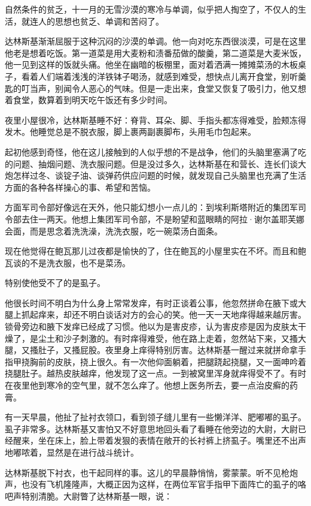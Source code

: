 自然条件的贫乏，十一月的无雪沙漠的寒冷与单调，似乎把人掏空了，不仅人的生活，就连人的思想也贫乏、单调和苦闷了。

达林斯基渐渐屈服于这种沉闷的沙漠的单调。他一向对吃东西很淡漠，可是在这里他老是想着吃饭。第一道菜是用大麦粉和渍番茄做的酸羹，第二道菜是大麦米饭，他一见到这样的饭就头痛。他坐在幽暗的板棚里，面对着洒满一摊摊菜汤的木板桌子，看着人们端着浅浅的洋铁钵子喝汤，就感到难受，想快点儿离开食堂，别听羹匙的叮当声，别闻令人恶心的气味。但是一走出来，食堂又恢复了吸引力，他又想着食堂，数算着到明天吃午饭还有多少时间。

夜里小屋很冷，达林斯基睡不好：脊背、耳朵、脚、手指头都冻得难受，脸颊冻得发木。他睡觉总是不脱衣服，脚上裹两副裹脚布，头用毛巾包起来。

起初他感到奇怪，他在这儿接触到的人似乎想的不是战争，他们的头脑里塞满了吃的问题、抽烟问题、洗衣服问题。但是没过多久，达林斯基在和营长、连长们谈大炮怎样过冬、谈锭子油、谈弹药供应问题的时候，就发现自己头脑里也充满了生活方面的各种各样操心的事、希望和苦恼。

方面军司令部好像远在天外，他只能幻想小一点儿的：到埃利斯塔附近的集团军司令部去住一两天。他想上集团军司令部，不是盼望和蓝眼睛的阿拉·谢尔盖耶芙娜会面，而是思念着洗洗澡，洗洗衣服，吃一碗菜汤白面条。

现在他觉得在鲍瓦那儿过夜都是愉快的了，住在鲍瓦的小屋里实在不坏。而且和鲍瓦谈的不是洗衣服，也不是菜汤。

特别使他受不了的是虱子。

他很长时间不明白为什么身上常常发痒，有时正谈着公事，他忽然拼命在腋下或大腿上抓起痒来，却还不明白谈话对方的会心的笑。他一天一天地痒得越来越厉害。锁骨旁边和腋下发痒已经成了习惯。他以为是害皮疹，认为害皮疹是因为皮肤太干燥了，是尘土和沙子刺激的。有时痒得难受，他在路上走着，忽然站下来，又搔大腿，又搔肚子，又搔屁股。夜里身上痒得特别厉害。达林斯基一醒过来就拼命拿手指甲挠胸前的皮肤，挠上很久。有一次他仰面躺着，把腿跷起挠腿，又一面呻吟着挠腿肚子。越热皮肤越痒，他发现了这一点。一到被窝里浑身就痒得受不了。有时在夜里他到寒冷的空气里，就不怎么痒了。他想上医务所去，要一点治皮癣的药膏。

有一天早晨，他扯了扯衬衣领口，看到领子缝儿里有一些懒洋洋、肥嘟嘟的虱子。虱子非常多。达林斯基又害怕又不好意思地回头看了看睡在他旁边的大尉，大尉已经醒来，坐在床上，脸上带着发狠的表情在敞开的长衬裤上挤虱子。嘴里还不出声地嘟哝着，显然是在进行战斗统计。

达林斯基脱下衬衣，也干起同样的事。这儿的早晨静悄悄，雾蒙蒙。听不见枪炮声，也没有飞机隆隆声，大概正因为这样，在两位军官手指甲下面阵亡的虱子的咯吧声特别清脆。大尉瞥了达林斯基一眼，说：

